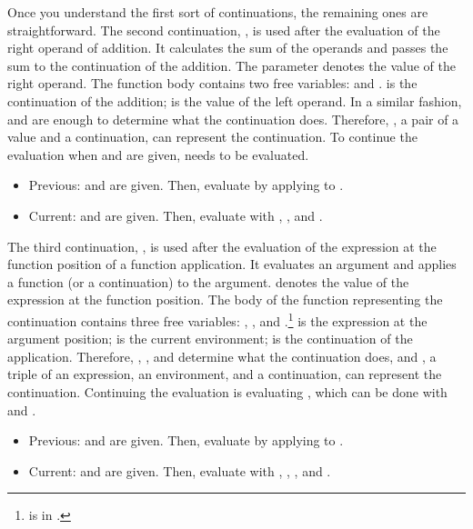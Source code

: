 Once you understand the first sort of continuations, the remaining ones are
straightforward. The second continuation, , is used after the evaluation of the right operand of addition. It
calculates the sum of the operands and passes the sum to the continuation of the
addition. The parameter  denotes the value of the right operand. The
function body contains two free variables:  and .  is
the continuation of the addition;  is the value of the left operand. In
a similar fashion,  and  are enough to determine what the
continuation does. Therefore, , a pair of a value and a
continuation, can represent the continuation. To continue the evaluation when
 and  are given,  needs
to be evaluated.

\begin{itemize}
  \item Previous:  and  are given.
  Then, evaluate  by applying  to .
  \item Current:  and  are given. Then, evaluate
   with , , and .
\end{itemize}

The third continuation, , is
used after the evaluation of the expression at the function position of
a function application. It evaluates an argument and applies a function (or
a continuation) to the argument.
 denotes the value of the expression at the function position. The body
of the function representing the continuation contains three free variables:
, , and .\footnote{ is in .}
 is the expression at the argument
position;  is the current environment;  is the continuation of
the application. Therefore, , ,
and  determine what the continuation does, and , a
triple of an expression, an environment, and a continuation, can represent the
continuation. Continuing the evaluation is evaluating , which can be done with  and .

\begin{itemize}
  \item Previous:  and 
  are given. Then, evaluate  by
  applying  to .
  \item Current:  and  are given. Then, evaluate
   with , ,
  , and .
\end{itemize}

